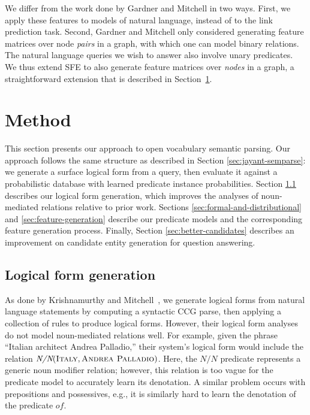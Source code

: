 \documentclass[11pt]{article}
\newcommand{\secref}[1]{Section~\ref{sec:#1}}
\newcommand{\lexicalpredicate}[1]{\ensuremath{\textit{#1}}}
\newcommand{\entity}[1]{\ensuremath{\textsc{#1}}}
\begin{document}
We differ from the work done by Gardner and Mitchell in two ways.
First, we apply these features to models of natural language, instead
of to the link prediction task.  Second, Gardner and Mitchell only
considered generating feature matrices over node \emph{pairs} in a
graph, with which one can model binary relations.  The natural
language queries we wish to answer also involve unary predicates.  We
thus extend SFE to also generate feature matrices over \emph{nodes} in
a graph, a straightforward extension that is described in
\secref{method}.

\section{Method}
\label{sec:method}

This section presents our approach to open vocabulary semantic
parsing. Our approach follows the same structure as described in
Section \ref{sec:jayant-semparse}: we generate a surface logical form
from a query, then evaluate it against a probabilistic database with
learned predicate instance probabilities. Section \ref{sec:better-lfs}
describes our logical form generation, which improves the analyses of
noun-mediated relations relative to prior work. Sections
\ref{sec:formal-and-distributional} and \ref{sec:feature-generation}
describe our predicate models and the corresponding feature generation
process. Finally, Section \ref{sec:better-candidates} describes an
improvement on candidate entity generation for question answering.

\subsection{Logical form generation}
\label{sec:better-lfs}

As done by Krishnamurthy and
Mitchell~, we
generate logical forms from natural language statements by computing a
syntactic CCG parse, then applying a collection of rules to produce
logical forms. However, their logical form analyses do not model
noun-mediated relations well. For example, given the phrase ``Italian
architect Andrea Palladio,'' their system's logical form would include
the relation $\lexicalpredicate{N/N}(\entity{Italy}, \entity{Andrea
Palladio})$. Here, the \lexicalpredicate{N/N} predicate represents a
generic noun modifier relation; however, this relation is too vague
for the predicate model to accurately learn its denotation. A similar
problem occurs with prepositions and possessives, e.g., it is
similarly hard to learn the denotation of the predicate
\lexicalpredicate{of}.
\end{document}
